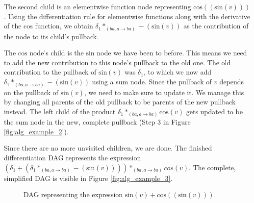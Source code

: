 \documentclass[12pt, a4paper]{report}
\begin{document}
The second child is an elementwise function node representing $\text{cos}((\text{sin}(v)))$.
Using the differentiation rule for elementwise functions along with the derivative of the $\text{cos}$ function, we obtain $\delta_1 *_{(ba,a \rightarrow ba)} -(\text{sin}(v))$ as the contribution of the node to its child's pullback.

The $\text{cos}$ node's child is the $\text{sin}$ node we have been to before.
This means we need to add the new contribution to this node's pullback to the old one.
The old contribution to the pullback of $\text{sin}(v)$ was $\delta_1$, to which we now add $\delta_1 *_{(ba,a \rightarrow ba)} -(\text{sin}(v))$ using a sum node.
Since the pullback of $v$ depends on the pullback of $\text{sin}(v)$, we need to make sure to update it.
We manage this by changing all parents of the old pullback to be parents of the new pullback instead.
The left child of the product $\delta_1 *_{(ba,a \rightarrow ba)} \text{cos}(v)$ gets updated to be the sum node in the new, complete pullback (Step 3 in Figure \ref{fig:alg_example_2}).

Since there are no more unvisited children, we are done.
The finished differentiation DAG represents the expression $(\delta_1 + (\delta_1 *_{(ba,a \rightarrow ba)} -(\text{sin}(v)))) *_{(ba,a \rightarrow ba)} cos(v)$.
The complete, simplified DAG is visible in Figure \ref{fig:alg_example_3}.

\begin{figure}
    \centering
    \caption{DAG representing the expression $\text{sin}(v) + \text{cos}((\text{sin}(v)))$.}
    \label{fig:alg_example_1}
\end{figure}
\end{document}
